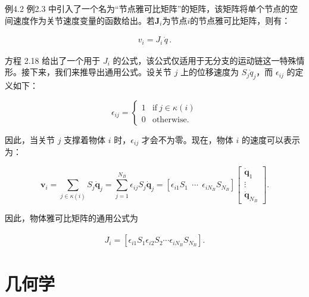 \documentclass[10pt,a4paper]{book}
\theoremstyle{thmstyle} %
\theoremstyle{defstyle} %
\theoremstyle{prostyle} %
\begin{document}
例4.2 例2.3 中引入了一个名为“节点雅可比矩阵”的矩阵，该矩阵将单个节点的空间速度作为关节速度变量的函数给出。若$\mathbf{J}_i$为节点$i$的节点雅可比矩阵，则有：



$$
\begin{array}{r} { v _ { i } = J _ { i } \, \dot { q } \, . } \end{array}
$$



方程 2.18 给出了一个用于 $J_{i}$ 的公式，该公式仅适用于无分支的运动链这一特殊情形。接下来，我们来推导出通用公式。设关节 $j$ 上的位移速度为 $S_{j}\dot{q}_{j}$，而 $\epsilon_{ij}$ 的定义如下：



$$
\epsilon _ { i j } = \left\{ \begin{array}{ll} { 1 } & { \mathrm { i f ~ } j \in \kappa ( i ) } \\{ 0 } & { \mathrm { o t h e r w i s e } . } \end{array} \right.
$$



因此，当关节 $j$ 支撑着物体 $i$ 时，$\epsilon_{ij}$ 才会不为零。现在，物体 $i$ 的速度可以表示为：



$$
\boldsymbol{ v } _ { i } = \sum _ { j \in \kappa ( i ) } S _ { j } \dot { \boldsymbol{ q } } _ { j } = \sum _ { j = 1 } ^{N _ { B} } \epsilon _ { i j } S _ { j } \dot { \boldsymbol{ q } } _ { j } = \left[ \epsilon _ { i 1 } S _ { 1 } \ \ \cdots \ \ \epsilon _ { i N _ { B } } S _ { N _ { B } } \right] \left[ \begin{array}{l} { \dot { \boldsymbol{ q } } _ { 1 } } \\{ \vdots } \\{ \dot { \boldsymbol{ q } } _ { N _ { B } } } \end{array} \right] .
$$



因此，物体雅可比矩阵的通用公式为



$$
\begin{array}{r} { J _ { i } = \left[ \epsilon _ { i 1 } S _ { 1 }  \epsilon _ { i 2 } S _ { 2 }  \cdots  \epsilon _ { i N _ { B } } S _ { N _ { B } } \right] . } \end{array}
$$



\section{几何学}
\end{document}
